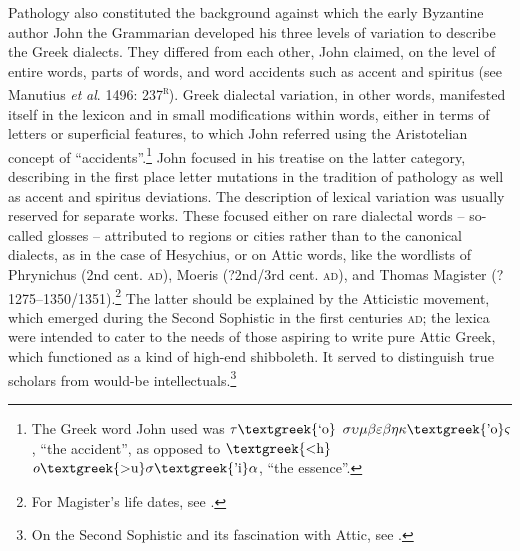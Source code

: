 \begin{styleCatalogusnotities}
Pathology also constituted the background against which the early Byzantine author John the Grammarian developed his three levels of variation to describe the Greek dialects. They differed from each other, John claimed, on the level of entire words, parts of words, and word accidents such as accent and spiritus (see Manutius \textit{et} \textit{al}. 1496: 237\textsc{\textsuperscript{r}}). Greek dialectal variation, in other words, manifested itself in the lexicon and in small modifications within words, either in terms of letters or superficial features, to which John referred using the Aristotelian concept of “accidents”.\footnote{The Greek word John used was $\tau \text{\textgreek{`o}}$ $\sigma \upsilon \mu \beta \varepsilon \beta \eta \kappa \text{\textgreek{'o}}\varsigma $, “the accident”, as opposed to $\text{\textgreek{<h}}$ $o\text{\textgreek{>u}}\sigma \text{\textgreek{'i}}\alpha $, “the essence”.} John focused in his treatise on the latter category, describing in the first place letter mutations in the tradition of pathology as well as accent and spiritus deviations. The description of lexical variation was usually reserved for separate works. These focused either on rare dialectal words – so-called glosses – attributed to regions or cities rather than to the canonical dialects, as in the case of Hesychius, or on Attic words, like the wordlists of Phrynichus (2nd cent. \textsc{ad}), Moeris (?2nd/3rd cent. \textsc{ad}), and Thomas Magister (?1275–1350/1351).\footnote{ \textrm{For Magister’s life dates, see \citet[417]{Baloglou1998}.}} The latter should be explained by the Atticistic movement, which emerged during the Second Sophistic in the first centuries \textsc{ad}; the lexica were intended to cater to the needs of those aspiring to write pure Attic Greek, which functioned as a kind of high-end shibboleth. It served to distinguish true scholars from would-be intellectuals.\footnote{On the Second Sophistic and its fascination with Attic, see \citet{Whitmarsh2005}.}
\end{styleCatalogusnotities}

